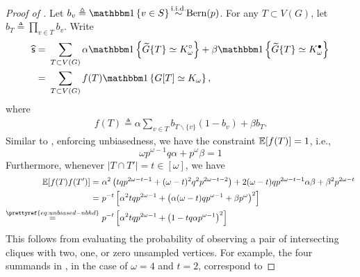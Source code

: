 \begin{proof}[Proof of ]
	Let $b_v \triangleq \indc{v\in S} \iiddistr \Bern(p)$. 
	For any $T\subset V(G)$, let $b_T \triangleq \prod_{v\in T} b_v$.
	Write
	\begin{align}
	\hat \s
	= & ~  \sum_{T \subset V(G)} \alpha \indc{\tilde G\{T\} \simeq \Kempty_\omega} + \beta \indc{\tilde G\{T\} \simeq \Kfull_\omega} \nonumber \\
	= & ~  \sum_{T \subset V(G)} f(T)  \indc{G[T] \simeq K_\omega}, \label{eq:neighborhood-est}
	\end{align}
	where 
	\begin{align*}
	f(T) 	\triangleq \alpha \sum_{v\in T} b_{T\backslash\{v\}} (1-b_v) + \beta b_T.
	\end{align*}
	Similar to , enforcing unbiasedness, we have the constraint $\mathbb{E}[f(T)]=1$, i.e.,
	\begin{equation}
	\omega p^{\omega-1}q \alpha + p^{\omega} \beta = 1 
	\label{eq:unbiased-nbhd}
	\end{equation}
	Furthermore, whenever $|T\cap T'| = t \in [\omega]$, we have
	\begin{align}
	\Expect[f(T)f(T')]
	= & ~ \alpha^2 \pth{t q p^{2\omega-t-1} + (\omega-t)^2 q^2p^{2\omega-t-2}} + 2(\omega-t) q p^{2\omega-t-1}\alpha\beta + \beta^2p^{2\omega-t}	\label{eq:fcross0}	\\
	= & ~ p^{-t} \qth{\alpha^2 t q p^{2\omega-1} +  \pth{ \alpha (\omega-t) q p^{\omega-1}  + \beta p^{\omega}}^2	} \nonumber \\
	\overset{\prettyref{eq:unbiased-nbhd}}{=} & ~ p^{-t} \qth{\alpha^2 t q p^{2\omega-1} +  \pth{ 1 - t q \alpha p^{\omega-1}}^2	}
	\label{eq:fcross}
	\end{align}
This follows from evaluating the probability of observing a pair of intersecting cliques with two, one, or zero unsampled vertices. For example, the four summands in , in the case of $\omega=4$ and $t=2$, correspond to 
\end{proof}
